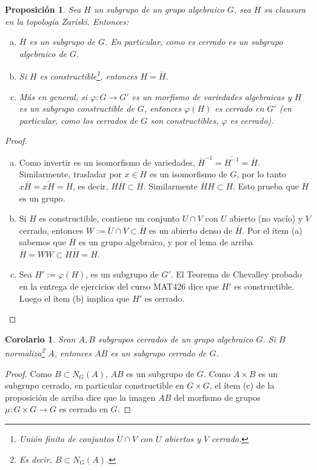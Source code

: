 \documentclass[spanish,10pt]{amsart}
\newtheorem{corollary}[theorem]{Corolario}
\newtheorem{proposition}[theorem]{Proposición}
\theoremstyle{definition}
\theoremstyle{remark}
\numberwithin{equation}{section}
\renewcommand{\bar}[1]{\overline{#1}}
\begin{document}
\begin{proposition}
Sea $H$ un subgrupo de un grupo algebraico $G$, sea $\bar H$ su clausura en la topología Zariski. Entonces:
\begin{enumerate}[(a)]
\item $\bar H$ es un subgrupo de $G$. En particular, como es cerrado es un subgrupo algebraico de $G$.
\item Si $H$ es \textit{constructible}\footnote{Unión finita de conjuntos $U \cap V$ con $U$ abiertos y $V$ cerrado.}, entonces $H = \bar H$.
\item Más en general, si $\varphi : G \to G'$ es un morfismo de variedades algebraicas y $H$ es un subgrupo constructible de $G$, entonces $\varphi (H)$ es cerrado en $G'$ (en particular, como los cerrados de $G$ son constructibles, $\varphi$ es \textit{cerrado}).
\end{enumerate}
\end{proposition}
\begin{proof}
\begin{enumerate}[(a)]
\item Como invertir es un isomorfismo de variedades, $\bar H ^{-1} = \bar{H^{-1}} = \bar H$. Similarmente, trasladar por $x \in H$ es un isomorfismo de $G$, por lo tanto $x \bar H = \bar{x H} = \bar H$, es decir, $H \bar H \subset \bar H$. Similarmente $\bar H H \subset H$. Esto prueba que $\bar H$ es un grupo.
\item Si $H$ es constructible, contiene un conjunto $U \cap V$ con $U$ abierto (no vacío) y $V$ cerrado, entonces $W := U \cap V \subset \bar H$ es un abierto denso de $\bar H$. Por el ítem (a) sabemos que $\bar H$ es un grupo algebraico, y por el lema de arriba $\bar H = W W \subset H H = H$.
\item Sea $H' := \varphi (H)$, es un subgrupo de $G'$. El Teorema de Chevalley probado en la entrega de ejercicios del curso MAT426 dice que $H'$ es constructible. Luego el ítem (b) implica que $H'$ es cerrado.
\end{enumerate}
\end{proof}

\begin{corollary}\label{corollary:si A y B son cerrados entonces AB es cerrado}
Sean $A,B$ subgrupos cerrados de un grupo algebraico $G$. Si $B$ \textit{normaliza}\footnote{Es decir, $B \subset N_G (A)$.} $A$, entonces $AB$ es un subgrupo cerrado de $G$.
\end{corollary}
\begin{proof}
Como $B \subset N_G (A)$, $AB$ es un subgrupo de $G$. Como $A \times B$ es un subgrupo cerrado, en particular constructible en $G \times G$, el ítem (c) de la proposición de arriba dice que la imagen $AB$ del morfismo de grupos $\mu : G \times G \to G$ es cerrado en $G$.
\end{proof}
\end{document}
